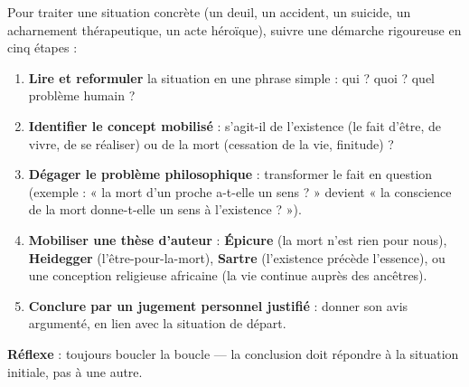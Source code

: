 \documentclass[11pt]{article}
\begin{document}
\begin{methode}
Pour traiter une situation concrète (un deuil, un accident, un suicide, un acharnement thérapeutique, un acte héroïque), suivre une démarche rigoureuse en cinq étapes :
\begin{enumerate}
\item \textbf{Lire et reformuler} la situation en une phrase simple : qui ? quoi ? quel problème humain ?
\item \textbf{Identifier le concept mobilisé} : s'agit-il de l'existence (le fait d'être, de vivre, de se réaliser) ou de la mort (cessation de la vie, finitude) ?
\item \textbf{Dégager le problème philosophique} : transformer le fait en question (exemple : « la mort d'un proche a-t-elle un sens ? » devient « la conscience de la mort donne-t-elle un sens à l'existence ? »).
\item \textbf{Mobiliser une thèse d'auteur} : \textbf{Épicure} (la mort n'est rien pour nous), \textbf{Heidegger} (l'être-pour-la-mort), \textbf{Sartre} (l'existence précède l'essence), ou une conception religieuse africaine (la vie continue auprès des ancêtres).
\item \textbf{Conclure par un jugement personnel justifié} : donner son avis argumenté, en lien avec la situation de départ.
\end{enumerate}
\textbf{Réflexe} : toujours boucler la boucle — la conclusion doit répondre à la situation initiale, pas à une autre.
\end{methode}
\end{document}
